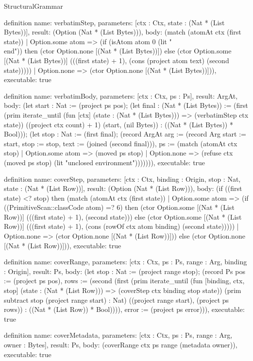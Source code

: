 \begin{lexlean}{StructuralGrammar}
\begin{semanticmodule}
{{definition{
  name: verbatimStep,
  parameters: [ctx : Ctx, state : (Nat * (List Bytes))],
  result: (Option (Nat * (List Bytes))),
  body: (match (atomAt ctx (first state))
    | Option.some atom => (if (isAtom atom 0 (lit "\\end")) then (ctor Option.none [(Nat * (List Bytes))]) else (ctor Option.some [(Nat * (List Bytes))] (((first state) + 1), (cons (project atom text) (second state)))))
    | Option.none => (ctor Option.none [(Nat * (List Bytes))])),
  executable: true
}

definition{
  name: verbatimBody,
  parameters: [ctx : Ctx, ps : Ps],
  result: ArgAt,
  body: (let start : Nat := (project ps pos); (let final : (Nat * (List Bytes)) := (first (prim iterate_until (fun [ctx] (state : (Nat * (List Bytes))) => (verbatimStep ctx state)) ((project ctx count) + 1) (start, (nil Bytes)) : ((Nat * (List Bytes)) * Bool))); (let stop : Nat := (first final); (record ArgAt {arg := (record Arg {start := start, stop := stop, text := (joined (second final))}), ps := (match (atomAt ctx stop)
    | Option.some atom => (moved ps stop)
    | Option.none => (refuse ctx (moved ps stop) (lit "unclosed environment")))})))),
  executable: true
}

definition{
  name: coverStep,
  parameters: [ctx : Ctx, binding : Origin, stop : Nat, state : (Nat * (List Row))],
  result: (Option (Nat * (List Row))),
  body: (if ((first state) <? stop) then (match (atomAt ctx (first state))
    | Option.some atom => (if ((PrimitiveScan::classCode atom) =? 6) then (ctor Option.some [(Nat * (List Row))] (((first state) + 1), (second state))) else (ctor Option.some [(Nat * (List Row))] (((first state) + 1), (cons (rowOf ctx atom binding) (second state)))))
    | Option.none => (ctor Option.none [(Nat * (List Row))])) else (ctor Option.none [(Nat * (List Row))])),
  executable: true
}

definition{
  name: coverRange,
  parameters: [ctx : Ctx, ps : Ps, range : Arg, binding : Origin],
  result: Ps,
  body: (let stop : Nat := (project range stop); (record Ps {pos := (project ps pos), rows := (second (first (prim iterate_until (fun [binding, ctx, stop] (state : (Nat * (List Row))) => (coverStep ctx binding stop state)) (prim subtract stop (project range start) : Nat) ((project range start), (project ps rows)) : ((Nat * (List Row)) * Bool)))), error := (project ps error)})),
  executable: true
}

definition{
  name: coverMetadata,
  parameters: [ctx : Ctx, ps : Ps, range : Arg, owner : Bytes],
  result: Ps,
  body: (coverRange ctx ps range (metadata owner)),
  executable: true
}

}}
\end{semanticmodule}
\end{lexlean}
